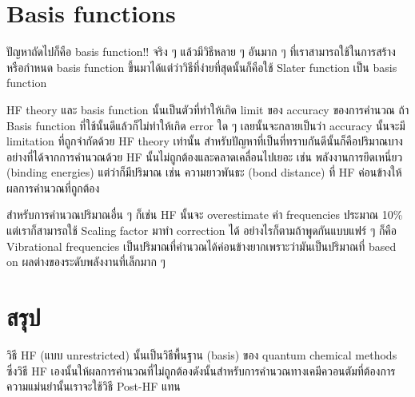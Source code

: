 \section{Basis functions}

ปัญหาถัดไปก็คือ basis function!! จริง ๆ แล้วมีวิธีหลาย ๆ อันมาก ๆ ที่เราสามารถใช้ในการสร้างหรือกำหนด
basis function ขึ้นมาได้แต่ว่าวิธีที่ง่ายที่สุดนั้นก็คือใช้ Slater function เป็น basis function

HF theory และ basis function นั้นเป็นตัวที่ทำให้เกิด limit ของ accuracy ของการคำนวณ ถ้า Basis
function ที่ใช้นั้นดีแล้วก็ไม่ทำให้เกิด error ใด ๆ เลยนั้นจะกลายเป็นว่า accuracy นั้นจะมี limitation
ที่ถูกจำกัดด้วย HF theory เท่านั้น สำหรับปัญหาที่เป็นที่ทราบกันดีนั้นก็คือปริมาณบางอย่างที่ได้จากการคำนวณด้วย HF
นั้นไม่ถูกต้องและคลาดเคลื่อนไปเยอะ เช่น พลังงานการยึดเหนี่ยว (binding energies) แต่ว่าก็มีปริมาณ 
เช่น ความยาวพันธะ (bond distance) ที่ HF ค่อนข้างให้ผลการคำนวณที่ถูกต้อง

สำหรับการคำนวณปริมาณอื่น ๆ ก็เช่น HF นั้นจะ overestimate ค่า frequencies ประมาณ 10\% แต่เราก็สามารถใช้
Scaling factor มาทำ correction ได้ อย่างไรก็ตามถ้าพูดกันแบบแฟร์ ๆ ก็คือ Vibrational frequencies
เป็นปริมาณที่คำนวณได้ค่อนข้างยากเพราะว่ามันเป็นปริมาณที่ based on ผลต่างของระดับพลังงานที่เล็กมาก ๆ

\section{สรุป}

วิธี HF (แบบ unrestricted) นั้นเป็นวิธีพื้นฐาน (basis) ของ quantum chemical methods ซึ่งวิธี HF
เองนั้นให้ผลการคำนวณที่ไม่ถูกต้องดังนั้นสำหรับการคำนวณทางเคมีควอนตัมที่ต้องการความแม่นยำนั้นเราจะใช้วิธี
Post-HF แทน
